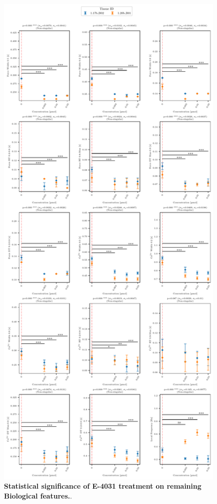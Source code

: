 \documentclass{report}
\begin{document}
        
    \begin{figure}
        \centering
        \includegraphics[width=1\textwidth, height=0.99\textheight, keepaspectratio]{plots/chapter_5/e4031/significance_features_lmer_subset_15.pdf}
        \caption[Statistical significance of E-4031 treatment on remaining Biological features.]{\textbf{Statistical significance of E-4031 treatment on remaining Biological features.}.}
        \label{fig:e4031-remaining-significance}
    \end{figure}
\end{document}
